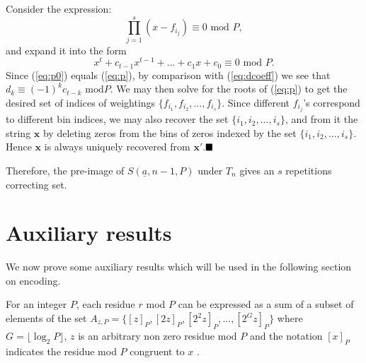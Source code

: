 Consider the expression:\vspace{-0.1in}
\begin{equation}\label{eq:p0} \prod_{j=1}^s(x-f_{i_j})\equiv 0 \text{ mod } P,
\end{equation}
and expand it into the form
\vspace{-0.1in}\begin{equation}\label{eq:p}
x^t+c_{t-1}x^{t-1}+...+c_1x+c_0 \equiv 0 \text{ mod } P.
\end{equation}
Since (\ref{eq:p0}) equals (\ref{eq:p}), by comparison with
(\ref{eq:dcoeff}) we see that $d_k \equiv (-1)^kc_{t-k} \text{ mod
} P$. We may then solve for the roots of (\ref{eq:p}) to get the
desired set of indices of weightings
$\{f_{i_1},f_{i_2},...,f_{i_s}\}$. Since different $f_{i_j}$'s
correspond to different bin indices, we may also recover the set
$\{{i_1},{i_2},...,{i_s}\}$, and from it the string $\mathbf{x}$
by deleting zeros from the bins of zeros indexed by the set
$\{{i_1},{i_2},...,{i_s}\}$. Hence $\mathbf{x}$ is always uniquely
recovered from $\mathbf{x'}$.$\hfill\blacksquare$

%

Therefore, the pre-image of $S(\underline{a},n-1,P)$ under $T_n$
gives an $s$ repetitions correcting set.


\section{Auxiliary results}\label{aux}
We now prove some auxiliary results which will be used in the
following section on encoding.

\begin{lemma}\label{generates} For an integer $P$, each residue $r$ mod $P$ can be expressed as a
sum of a subset of elements of the set
$A_{z,P}=\{[z]_P,[2z]_P,[2^2z]_P,...,[2^{G}z]_P\}$ where
$G=\lfloor \log_2 P \rfloor $, $z$ is an arbitrary non zero
residue mod $P$ and the notation $[x]_P$ indicates the residue mod
$P$ congruent to $x$ .
\end{lemma}

